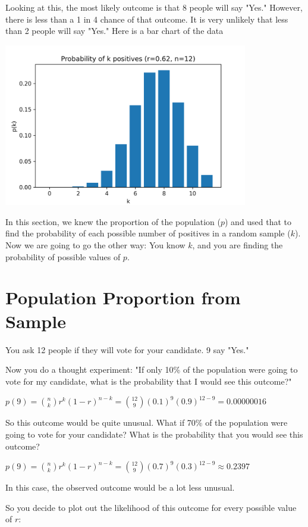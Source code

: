 Looking at this,  the most likely outcome is that 8 people will say "Yes."  However,  there is less than a 1 in 4 chance of that outcome.   It is very unlikely that less than 2 people will say "Yes."  
Here is a bar chart of the data

\includegraphics[width=0.8\textwidth]{binomial_dist.png}

In this section,  we knew the proportion of the population ($p$) and used that to find the probability of each possible number of positives in a random sample ($k$).  
Now we are going to go the other way:  You know $k$, and you are finding the probability of possible values of $p$.


\section{Population Proportion from Sample}

You ask 12 people if they will vote for your candidate.  9 say "Yes."

Now you do a thought experiment:  "If only 10\% of the population were going to vote for my candidate,  what is the probability that I would see this outcome?"

$p(9) =  \binom{n}{k}r^k(1-r)^{n-k} =  \binom{12}{9}(0.1)^9 (0.9)^{12-9} = 0.00000016$

So this outcome would be quite unusual.   What if 70\% of the population were going to vote for your candidate?  What is the probability that you would see this outcome?

$p(9) =  \binom{n}{k}r^k(1-r)^{n-k} =  \binom{12}{9}(0.7)^9 (0.3)^{12-9} \approx 0.2397$

In this case, the observed outcome would be a lot less unusual.

So you decide to plot out the likelihood of this outcome for every possible value of $r$:

